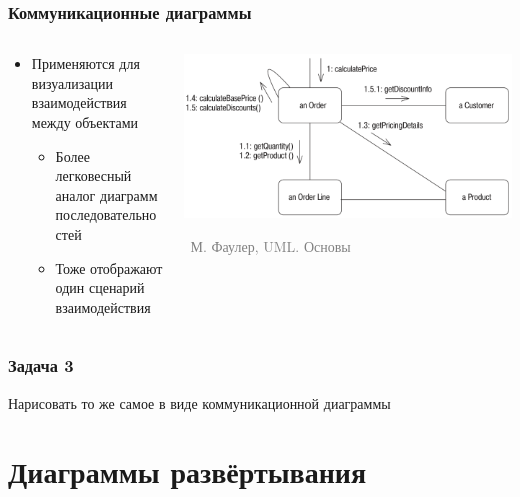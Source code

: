 \documentclass[xetex,mathserif,serif]{beamer}
\newcommand{\attribution}[1] {
	\vspace{-5mm}\begin{flushright}\begin{scriptsize}\textcolor{gray}{\textcopyright\, #1}\end{scriptsize}\end{flushright}
}
\begin{document}
	\begin{frame}
		\frametitle{Коммуникационные диаграммы}
		\begin{columns}
			\begin{column}{0.5\textwidth}
				\begin{itemize}
					\item Применяются для визуализации взаимодействия между объектами
					\begin{itemize}
						\item Более легковесный аналог диаграмм последовательностей
						\item Тоже отображают один сценарий взаимодействия
					\end{itemize}
				\end{itemize}
			\end{column}
			\begin{column}{0.5\textwidth}
				\begin{center}
					\includegraphics[width=\textwidth]{communicationDiagram.png}
					\attribution{М. Фаулер, UML. Основы}
				\end{center}
			\end{column}
		\end{columns}
	\end{frame}

	\begin{frame}
		\frametitle{Задача 3}
		Нарисовать то же самое в виде коммуникационной диаграммы
	\end{frame}

	\section{Диаграммы развёртывания}
\end{document}
